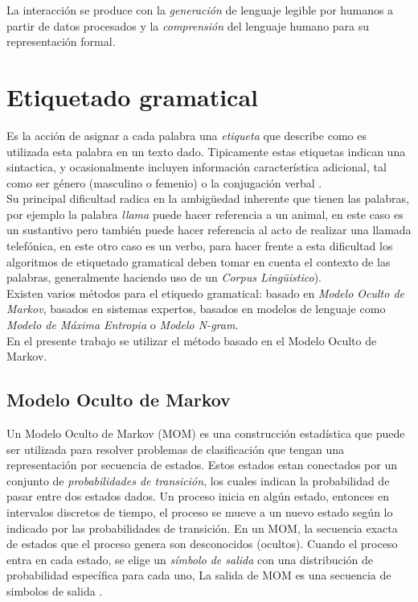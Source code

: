 La interacci\'on se produce con la \emph{generaci\'on} de lenguaje legible por humanos
a partir de datos procesados y la \emph{comprensi\'on} del lenguaje humano para su
representaci\'on formal.


\section{Etiquetado gramatical}
Es la acci\'on de asignar a cada palabra una \emph{etiqueta} que describe como es
utilizada esta palabra en un texto dado. Tipicamente estas etiquetas indican una
sintactica, y ocasionalmente incluyen informaci\'on caracter\'istica adicional, tal
como ser g\'enero (masculino o femenio) o la conjugaci\'on verbal \cite{TH99}. \\

Su principal dificultad radica en la ambig\"uedad inherente
que tienen las palabras, por ejemplo la palabra \emph{llama} puede hacer referencia a 
un animal, en este caso es un sustantivo pero tambi\'en puede hacer referencia al 
acto de realizar una llamada telef\'onica, en este otro caso es un
verbo, para hacer frente a esta dificultad los algoritmos de etiquetado gramatical 
deben tomar en cuenta el contexto de las palabras, generalmente haciendo uso de un 
\emph{Corpus Ling\"uistico}). \\

Existen varios m\'etodos para el etiquedo gramatical: basado en \emph{Modelo Oculto
de Markov}, basados en sistemas expertos, basados en modelos de lenguaje como
\emph{Modelo de M\'axima Entropia} o \emph{Modelo N-gram}. \\

En el presente trabajo se utilizar el m\'etodo basado en el Modelo Oculto de Markov.

\subsection{Modelo Oculto de Markov}
Un Modelo Oculto de Markov (MOM) es una construcci\'on estad\'istica que puede ser
utilizada para resolver problemas de clasificaci\'on que tengan una representaci\'on
por secuencia de estados. Estos estados estan conectados por un conjunto
de \emph{probabilidades de transici\'on}, los cuales indican la probabilidad de pasar
entre dos estados dados. Un proceso inicia en alg\'un estado, entonces en intervalos
discretos de tiempo, el proceso se mueve a un nuevo estado seg\'un lo indicado 
por las probabilidades de transici\'on. En un MOM, la secuencia exacta de estados
que el proceso genera son desconocidos (ocultos). Cuando el proceso entra en cada
estado, se elige un \emph{s\'imbolo de salida} con una distribuci\'on de probabilidad
espec\'ifica para cada uno, La salida de MOM es una secuencia de simbolos de 
salida \cite{TH99}. \\

